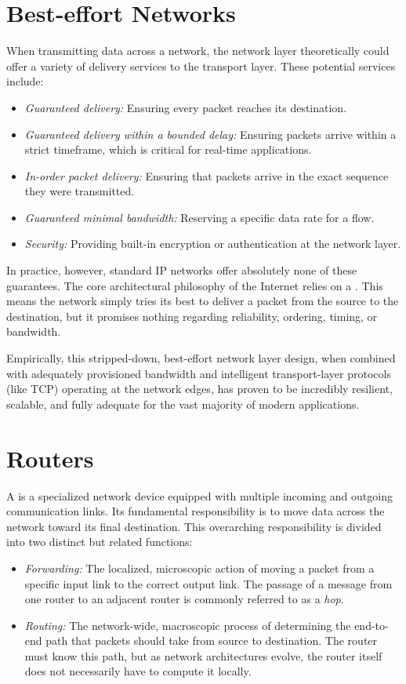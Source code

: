 \section{Best-effort Networks}

When transmitting data across a network, the network layer theoretically could offer a variety of delivery services to the transport layer. These potential services include:
\begin{itemize}
    \item \emph{Guaranteed delivery:} Ensuring every packet reaches its destination.
    \item \emph{Guaranteed delivery within a bounded delay:} Ensuring packets arrive within a strict timeframe, which is critical for real-time applications.
    \item \emph{In-order packet delivery:} Ensuring that packets arrive in the exact sequence they were transmitted.
    \item \emph{Guaranteed minimal bandwidth:} Reserving a specific data rate for a flow.
    \item \emph{Security:} Providing built-in encryption or authentication at the network layer.
\end{itemize}

In practice, however, standard IP networks offer absolutely none of these guarantees. The core architectural philosophy of the Internet relies on a  \cite{kurose2017}. This means the network simply tries its best to deliver a packet from the source to the destination, but it promises nothing regarding reliability, ordering, timing, or bandwidth. 

Empirically, this stripped-down, best-effort network layer design, when combined with adequately provisioned bandwidth and intelligent transport-layer protocols (like TCP) operating at the network edges, has proven to be incredibly resilient, scalable, and fully adequate for the vast majority of modern applications.

\section{Routers}

A  is a specialized network device equipped with multiple incoming and outgoing communication links. Its fundamental responsibility is to move data across the network toward its final destination. This overarching responsibility is divided into two distinct but related functions:
\begin{itemize}
    \item \emph{Forwarding:} The localized, microscopic action of moving a packet from a specific input link to the correct output link. The passage of a message from one router to an adjacent router is commonly referred to as a \emph{hop}.
    \item \emph{Routing:} The network-wide, macroscopic process of determining the end-to-end path that packets should take from source to destination. The router must know this path, but as network architectures evolve, the router itself does not necessarily have to compute it locally.
\end{itemize}

